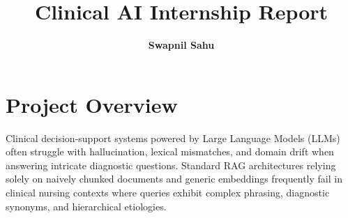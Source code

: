 \documentclass[11pt,a4paper]{article}
\title{\vspace{-1.5cm}\textbf{\huge\color{primaryblue} Clinical AI Internship Report}}
\author{\textbf{\Large Swapnil Sahu}}
\date{}
\begin{document}
\maketitle
\thispagestyle{empty}
\vspace{-1.0cm}

\section{Project Overview}
Clinical decision-support systems powered by Large Language Models (LLMs) often struggle with hallucination, lexical mismatches, and domain drift when answering intricate diagnostic questions. Standard RAG architectures relying solely on naively chunked documents and generic embeddings frequently fail in clinical nursing contexts where queries exhibit complex phrasing, diagnostic synonyms, and hierarchical etiologies.
\end{document}
